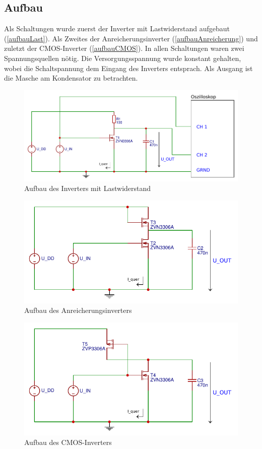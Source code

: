 \documentclass[11pt, a4paper]{article}
\begin{document}
\subsection*{Aufbau}
Als Schaltungen wurde zuerst der Inverter mit Lastwiderstand aufgebaut (\autoref{aufbauLast}). Als Zweites der Anreicherungsinverter (\autoref{aufbauAnreicherung}) und zuletzt der CMOS-Inverter (\autoref{aufbauCMOS}).
In allen Schaltungen waren zwei Spannungsquellen nötig. Die Versorgungsspannung wurde konstant gehalten, wobei die Schaltspannung dem Eingang des Inverters entsprach. Als Ausgang ist die Masche am Kondensator zu betrachten.
\begin{figure}
    \centering
    \includegraphics[width=\linewidth]{aufbauLast.pdf}
    \caption{Aufbau des Inverters mit Lastwiderstand}
    \label{aufbauLast}
\end{figure}
\begin{figure}
    \centering
    \includegraphics[width=\linewidth]{aufbauAnreicherung.pdf}
    \caption{Aufbau des Anreicherungsinverters}
    \label{aufbauAnreicherung}
\end{figure}
\begin{figure}
    \centering
    \includegraphics[width=\linewidth]{aufbauCMOS.pdf}
    \caption{Aufbau des CMOS-Inverters}
    \label{aufbauCMOS}
\end{figure}
\end{document}
